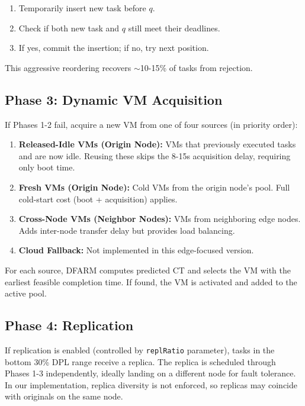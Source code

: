 \documentclass[12pt]{report}
\begin{document}
\begin{enumerate}
    \item Temporarily insert new task before $q$.
    \item Check if both new task and $q$ still meet their deadlines.
    \item If yes, commit the insertion; if no, try next position.
\end{enumerate}

This aggressive reordering recovers $\sim$10-15\% of tasks from rejection.

\subsection{Phase 3: Dynamic VM Acquisition}

If Phases 1-2 fail, acquire a new VM from one of four sources (in priority order):

\begin{enumerate}
    \item \textbf{Released-Idle VMs (Origin Node):} VMs that previously executed tasks and are now idle. Reusing these skips the 8-15s acquisition delay, requiring only boot time.
    
    \item \textbf{Fresh VMs (Origin Node):} Cold VMs from the origin node's pool. Full cold-start cost (boot + acquisition) applies.
    
    \item \textbf{Cross-Node VMs (Neighbor Nodes):} VMs from neighboring edge nodes. Adds inter-node transfer delay but provides load balancing.
    
    \item \textbf{Cloud Fallback:} Not implemented in this edge-focused version.
\end{enumerate}

For each source, DFARM computes predicted CT and selects the VM with the earliest feasible completion time. If found, the VM is activated and added to the active pool.

\subsection{Phase 4: Replication}

If replication is enabled (controlled by \texttt{replRatio} parameter), tasks in the bottom 30\% DPL range receive a replica. The replica is scheduled through Phases 1-3 independently, ideally landing on a different node for fault tolerance. In our implementation, replica diversity is not enforced, so replicas may coincide with originals on the same node.
\end{document}
